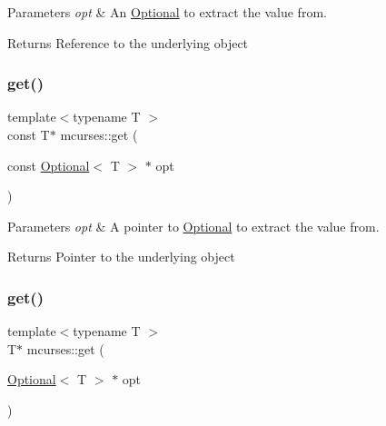 \begin{DoxyParams}{Parameters}
{\em opt} & An \hyperlink{classmcurses_1_1Optional}{Optional} to extract the value from. \\
\hline
\end{DoxyParams}
\begin{DoxyReturn}{Returns}
Reference to the underlying object 
\end{DoxyReturn}
\hypertarget{namespacemcurses_ac518dd9b4c181ecb07ddfe3a76b810f6}{}\label{namespacemcurses_ac518dd9b4c181ecb07ddfe3a76b810f6} 
\subsubsection{\texorpdfstring{get()}{get()}\hspace{0.1cm}{\footnotesize\ttfamily [3/4]}}
{\footnotesize\ttfamily template$<$typename T $>$ \\
const T$\ast$ mcurses\+::get (\begin{DoxyParamCaption}\item[{const \hyperlink{classmcurses_1_1Optional}{Optional}$<$ T $>$ $\ast$}]{opt }\end{DoxyParamCaption})}


\begin{DoxyParams}{Parameters}
{\em opt} & A pointer to \hyperlink{classmcurses_1_1Optional}{Optional} to extract the value from. \\
\hline
\end{DoxyParams}
\begin{DoxyReturn}{Returns}
Pointer to the underlying object 
\end{DoxyReturn}
\hypertarget{namespacemcurses_a2f17cb40b825113e523fd0c67bfc85c0}{}\label{namespacemcurses_a2f17cb40b825113e523fd0c67bfc85c0} 
\subsubsection{\texorpdfstring{get()}{get()}\hspace{0.1cm}{\footnotesize\ttfamily [4/4]}}
{\footnotesize\ttfamily template$<$typename T $>$ \\
T$\ast$ mcurses\+::get (\begin{DoxyParamCaption}\item[{\hyperlink{classmcurses_1_1Optional}{Optional}$<$ T $>$ $\ast$}]{opt }\end{DoxyParamCaption})}


